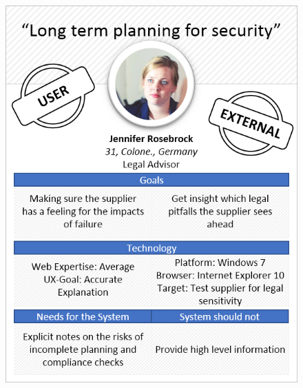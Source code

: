 \begin{figure}[H] 
        \centering\includegraphics[width=\textwidth]{img/diagrams/personas/customer2.png}
	\captionsetup{labelformat=empty}
        \caption[]{}
\end{figure}

